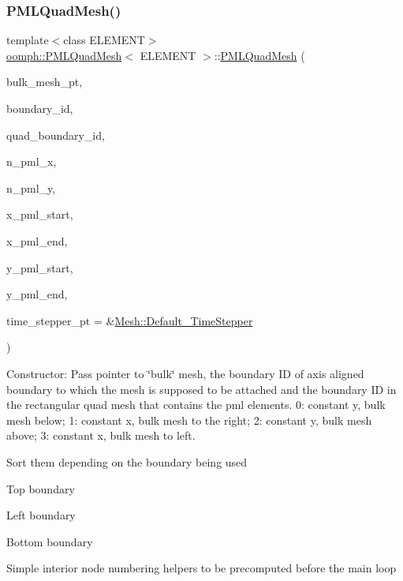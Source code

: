 \subsubsection{\texorpdfstring{P\+M\+L\+Quad\+Mesh()}{PMLQuadMesh()}}
{\footnotesize\ttfamily template$<$class E\+L\+E\+M\+E\+NT$>$ \\
\hyperlink{classoomph_1_1PMLQuadMesh}{oomph\+::\+P\+M\+L\+Quad\+Mesh}$<$ E\+L\+E\+M\+E\+NT $>$\+::\hyperlink{classoomph_1_1PMLQuadMesh}{P\+M\+L\+Quad\+Mesh} (\begin{DoxyParamCaption}\item[{\hyperlink{classoomph_1_1Mesh}{Mesh} $\ast$}]{bulk\+\_\+mesh\+\_\+pt,  }\item[{const unsigned \&}]{boundary\+\_\+id,  }\item[{const unsigned \&}]{quad\+\_\+boundary\+\_\+id,  }\item[{const unsigned \&}]{n\+\_\+pml\+\_\+x,  }\item[{const unsigned \&}]{n\+\_\+pml\+\_\+y,  }\item[{const double \&}]{x\+\_\+pml\+\_\+start,  }\item[{const double \&}]{x\+\_\+pml\+\_\+end,  }\item[{const double \&}]{y\+\_\+pml\+\_\+start,  }\item[{const double \&}]{y\+\_\+pml\+\_\+end,  }\item[{\hyperlink{classoomph_1_1TimeStepper}{Time\+Stepper} $\ast$}]{time\+\_\+stepper\+\_\+pt = {\ttfamily \&\hyperlink{classoomph_1_1Mesh_a12243d0fee2b1fcee729ee5a4777ea10}{Mesh\+::\+Default\+\_\+\+Time\+Stepper}} }\end{DoxyParamCaption})\hspace{0.3cm}{\ttfamily [inline]}}



Constructor\+: Pass pointer to \char`\"{}bulk\char`\"{} mesh, the boundary ID of axis aligned boundary to which the mesh is supposed to be attached and the boundary ID in the rectangular quad mesh that contains the pml elements. 0\+: constant y, bulk mesh below; 1\+: constant x, bulk mesh to the right; 2\+: constant y, bulk mesh above; 3\+: constant x, bulk mesh to left. 

Sort them depending on the boundary being used

Top boundary

Left boundary

Bottom boundary

Simple interior node numbering helpers to be precomputed before the main loop

